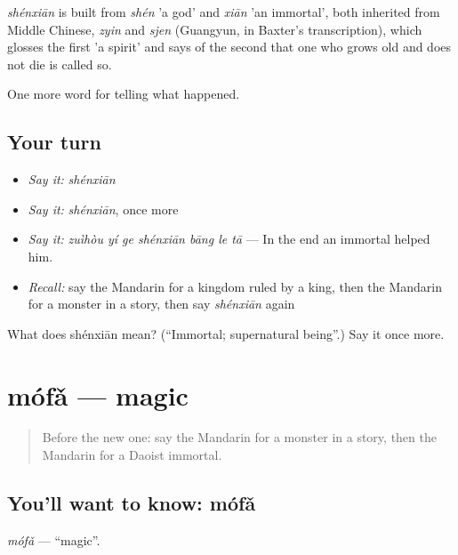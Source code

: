 \begin{cousinweb}
\emph{shénxiān} is built from \emph{shén} 'a god' and \emph{xiān} 'an immortal', both inherited from Middle Chinese, \emph{zyin} and \emph{sjen} (Guangyun, in Baxter's transcription), which glosses the first 'a spirit' and says of the second that one who grows old and does not die is called so.
\end{cousinweb}

\begin{grammarlens}[title={What you've built}]
One more word for telling what happened.
\end{grammarlens}

\subsection*{Your turn}
\begin{itemize}
\raggedright
  \item \emph{Say it:} \emph{shénxiān}
  \item \emph{Say it:} \emph{shénxiān}, once more
  \item \emph{Say it:} \emph{zuìhòu yí ge shénxiān bāng le tā} — In the end an immortal helped him.
  \item \emph{Recall:} say the Mandarin for a kingdom ruled by a king, then the Mandarin for a monster in a story, then say \emph{shénxiān} again
\end{itemize}

\begin{tcolorbox}[breakable,colback=teal!4,colframe=teal!35!black,title={Before you move on}]
What does shénxiān mean? (\textquotedblleft{}Immortal; supernatural being\textquotedblright{}.) Say it once more.
\end{tcolorbox}
\section[mófǎ]{mófǎ — magic}

\label{lesson:ZH-C331-mofa}



\begin{quote}
Before the new one: say the Mandarin for a monster in a story, then the Mandarin for a Daoist immortal.
\end{quote}

\subsection*{You'll want to know: mófǎ}
\emph{mófǎ} — \textquotedblleft{}magic\textquotedblright{}.

